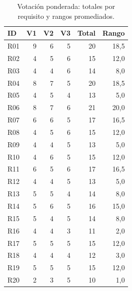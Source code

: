 \begin{table}[H]
\centering
\footnotesize
\caption{Votación ponderada: totales por requisito y rangos promediados.}
\label{tab:votacion}
\begin{tabular}{@{}lrrrrr@{}}
\toprule
ID & V1 & V2 & V3 & Total & Rango \\
\midrule
R01 & 9 & 6 & 5 & 20 & 18,5 \\
R02 & 4 & 5 & 6 & 15 & 12,0 \\
R03 & 4 & 4 & 6 & 14 & 8,0 \\
R04 & 8 & 7 & 5 & 20 & 18,5 \\
R05 & 4 & 5 & 4 & 13 & 5,0 \\
R06 & 8 & 7 & 6 & 21 & 20,0 \\
R07 & 6 & 6 & 5 & 17 & 16,5 \\
R08 & 4 & 5 & 6 & 15 & 12,0 \\
R09 & 4 & 4 & 5 & 13 & 5,0 \\
R10 & 4 & 6 & 5 & 15 & 12,0 \\
R11 & 6 & 5 & 6 & 17 & 16,5 \\
R12 & 4 & 4 & 5 & 13 & 5,0 \\
R13 & 5 & 5 & 4 & 14 & 8,0 \\
R14 & 5 & 6 & 5 & 16 & 15,0 \\
R15 & 5 & 4 & 5 & 14 & 8,0 \\
R16 & 4 & 4 & 3 & 11 & 2,0 \\
R17 & 5 & 5 & 5 & 15 & 12,0 \\
R18 & 4 & 4 & 4 & 12 & 3,0 \\
R19 & 5 & 5 & 5 & 15 & 12,0 \\
R20 & 2 & 3 & 5 & 10 & 1,0 \\
\bottomrule
\end{tabular}
\end{table}
